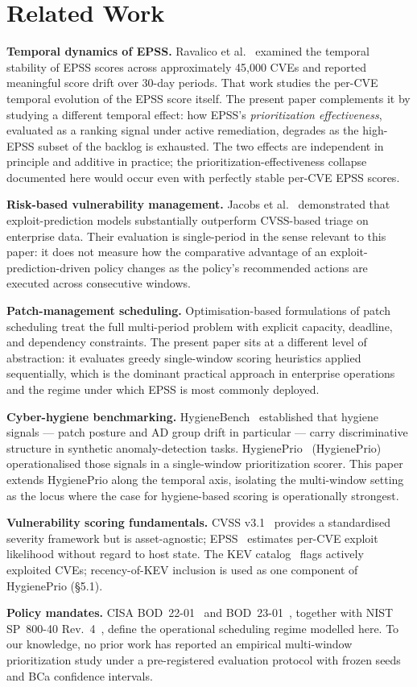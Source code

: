 \section{Related Work}

\textbf{Temporal dynamics of EPSS.} Ravalico et al.~\cite{ravalico2025epsstemporal} examined the temporal stability of EPSS scores across approximately 45{,}000 CVEs and reported meaningful score drift over 30-day periods. That work studies the per-CVE temporal evolution of the EPSS score itself. The present paper complements it by studying a different temporal effect: how EPSS's \textit{prioritization effectiveness}, evaluated as a ranking signal under active remediation, degrades as the high-EPSS subset of the backlog is exhausted. The two effects are independent in principle and additive in practice; the prioritization-effectiveness collapse documented here would occur even with perfectly stable per-CVE EPSS scores.

\textbf{Risk-based vulnerability management.} Jacobs et al.~\cite{jacobs2020improving} demonstrated that exploit-prediction models substantially outperform CVSS-based triage on enterprise data. Their evaluation is single-period in the sense relevant to this paper: it does not measure how the comparative advantage of an exploit-prediction-driven policy changes as the policy's recommended actions are executed across consecutive windows.

\textbf{Patch-management scheduling.} Optimisation-based formulations of patch scheduling treat the full multi-period problem with explicit capacity, deadline, and dependency constraints. The present paper sits at a different level of abstraction: it evaluates greedy single-window scoring heuristics applied sequentially, which is the dominant practical approach in enterprise operations and the regime under which EPSS is most commonly deployed.

\textbf{Cyber-hygiene benchmarking.} HygieneBench~\cite{paper3hygienebench} established that hygiene signals --- patch posture and AD group drift in particular --- carry discriminative structure in synthetic anomaly-detection tasks. HygienePrio~\cite{paper4hygieneprio} (HygienePrio) operationalised those signals in a single-window prioritization scorer. This paper extends HygienePrio along the temporal axis, isolating the multi-window setting as the locus where the case for hygiene-based scoring is operationally strongest.

\textbf{Vulnerability scoring fundamentals.} CVSS v3.1~\cite{first2019cvss} provides a standardised severity framework but is asset-agnostic; EPSS~\cite{jacobs2021epss} estimates per-CVE exploit likelihood without regard to host state. The KEV catalog~\cite{cisa2026kev} flags actively exploited CVEs; recency-of-KEV inclusion is used as one component of HygienePrio (\S5.1).

\textbf{Policy mandates.} CISA BOD~22-01~\cite{cisa2021bod2201} and BOD~23-01~\cite{cisa2022bod2301}, together with NIST SP~800-40 Rev.~4~\cite{nist2022sp80040r4}, define the operational scheduling regime modelled here. To our knowledge, no prior work has reported an empirical multi-window prioritization study under a pre-registered evaluation protocol with frozen seeds and BCa confidence intervals.
